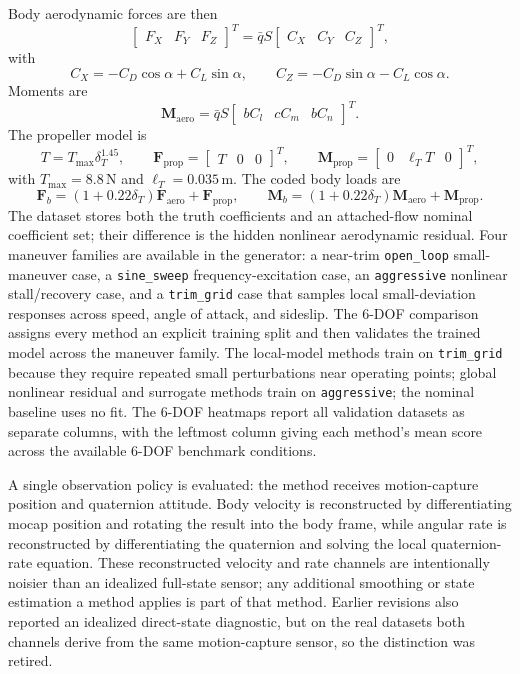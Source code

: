 \documentclass[11pt]{article}
\begin{document}
Body aerodynamic forces are then
\[
\begin{bmatrix}F_X&F_Y&F_Z\end{bmatrix}^T
= \bar{q}S\begin{bmatrix}C_X&C_Y&C_Z\end{bmatrix}^T,
\]
with
\[
C_X=-C_D\cos\alpha+C_L\sin\alpha,\qquad
C_Z=-C_D\sin\alpha-C_L\cos\alpha.
\]
Moments are
\[
\mathbf{M}_{\mathrm{aero}}=\bar{q}S
\begin{bmatrix}
bC_l & cC_m & bC_n
\end{bmatrix}^T.
\]
The propeller model is
\[
T=T_{\max}\delta_T^{1.45},\qquad
\mathbf{F}_{\mathrm{prop}}=\begin{bmatrix}T&0&0\end{bmatrix}^T,\qquad
\mathbf{M}_{\mathrm{prop}}=\begin{bmatrix}0&\ell_TT&0\end{bmatrix}^T,
\]
with $T_{\max}=8.8\,\mathrm{N}$ and $\ell_T=0.035\,\mathrm{m}$. The coded body loads are
\[
\mathbf{F}_b=(1+0.22\delta_T)\mathbf{F}_{\mathrm{aero}}+\mathbf{F}_{\mathrm{prop}},
\qquad
\mathbf{M}_b=(1+0.22\delta_T)\mathbf{M}_{\mathrm{aero}}+\mathbf{M}_{\mathrm{prop}}.
\]
The dataset stores both the truth coefficients and an attached-flow nominal coefficient set; their difference is the hidden nonlinear aerodynamic residual. Four maneuver families are available in the generator: a near-trim \texttt{open\_loop} small-maneuver case, a \texttt{sine\_sweep} frequency-excitation case, an \texttt{aggressive} nonlinear stall/recovery case, and a \texttt{trim\_grid} case that samples local small-deviation responses across speed, angle of attack, and sideslip. The 6-DOF comparison assigns every method an explicit training split and then validates the trained model across the maneuver family. The local-model methods train on \texttt{trim\_grid} because they require repeated small perturbations near operating points; global nonlinear residual and surrogate methods train on \texttt{aggressive}; the nominal baseline uses no fit. The 6-DOF heatmaps report all validation datasets as separate columns, with the leftmost column giving each method's mean score across the available 6-DOF benchmark conditions.

A single observation policy is evaluated: the method receives motion-capture position and quaternion attitude. Body velocity is reconstructed by differentiating mocap position and rotating the result into the body frame, while angular rate is reconstructed by differentiating the quaternion and solving the local quaternion-rate equation. These reconstructed velocity and rate channels are intentionally noisier than an idealized full-state sensor; any additional smoothing or state estimation a method applies is part of that method. Earlier revisions also reported an idealized direct-state diagnostic, but on the real datasets both channels derive from the same motion-capture sensor, so the distinction was retired.
\end{document}
